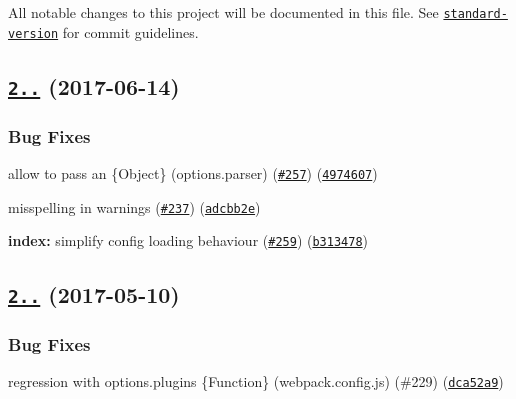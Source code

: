 All notable changes to this project will be documented in this file. See \href{https://github.com/conventional-changelog/standard-version}{\tt standard-\/version} for commit guidelines.

\label{_2.0.6}%
 \subsection*{\href{https://github.com/postcss/postcss-loader/compare/v2.0.5...v2.0.6}{\tt 2..} (2017-\/06-\/14)}

\subsubsection*{Bug Fixes}


\begin{DoxyItemize}
\item allow to pass an {\ttfamily \{Object\}} ({\ttfamily options.\+parser}) (\href{https://github.com/postcss/postcss-loader/issues/257}{\tt \#257}) (\href{https://github.com/postcss/postcss-loader/commit/4974607}{\tt 4974607})
\item misspelling in warnings (\href{https://github.com/postcss/postcss-loader/issues/237}{\tt \#237}) (\href{https://github.com/postcss/postcss-loader/commit/adcbb2e}{\tt adcbb2e})
\item {\bfseries index\+:} simplify config loading behaviour (\href{https://github.com/postcss/postcss-loader/issues/259}{\tt \#259}) (\href{https://github.com/postcss/postcss-loader/commit/b313478}{\tt b313478})
\end{DoxyItemize}

\label{_2.0.5}%
 \subsection*{\href{https://github.com/postcss/postcss-loader/compare/v2.0.4...v2.0.5}{\tt 2..} (2017-\/05-\/10)}

\subsubsection*{Bug Fixes}


\begin{DoxyItemize}
\item regression with {\ttfamily options.\+plugins} {\ttfamily \{Function\}} ({\ttfamily webpack.\+config.\+js}) (\#229) (\href{https://github.com/postcss/postcss-loader/commit/dca52a9}{\tt dca52a9})
\end{DoxyItemize}

